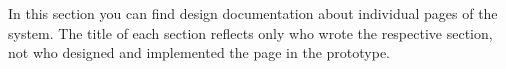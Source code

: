 \documentclass[12pt]{article}
\begin{document}
In this section you can find design documentation about individual pages of the system. The title of each section reflects only who wrote the respective section, not who designed and implemented the page in the prototype.
















\newpage
\end{document}
